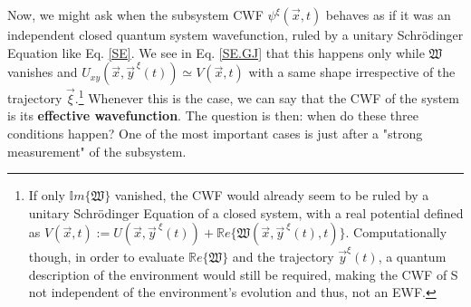 \documentclass[11pt, a4paper]{article} %
\newcommand{\R}{\mathbb{R}} %
\begin{document}
Now, we might ask when the subsystem CWF $\psi^\xi(\vec{x},t)$ behaves as if it was an independent closed quantum system wavefunction, ruled by a unitary Schrödinger Equation like Eq. \eqref{SE}. We see in Eq. \eqref{SE.GJ} that this happens only while $\mathfrak{W}$ vanishes and $U_{xy}(\vec{x},\vec{y}^{\,\xi}(t))\simeq V(\vec{x},t)$ with a same shape irrespective of the trajectory $\vec{\xi}$.\footnote{ If only $\mathbb{I}m\{\mathfrak{W}\}$ vanished, the CWF would already seem to be ruled by a unitary Schrödinger Equation of a closed system, with a real potential defined as $V(\vec{x},t):=U(\vec{x},\vec{y}^{\:\xi}(t))+\R e\{\mathfrak{W}(\vec{x},\vec{y}^{\:\xi}(t),t)\}$. Computationally though, in order to evaluate $\R e\{\mathfrak{W}\}$ and the trajectory $\vec{y}^\xi(t)$, a quantum description of the environment would still be required, making the CWF of S not independent of the environment's evolution and thus, not an EWF. } Whenever this is the case, we can say that the CWF of the system is its {\bf effective wavefunction}. The question is then: when do these three conditions happen? One of the most important cases is just after a "strong measurement" of the subsystem. 
\end{document}

